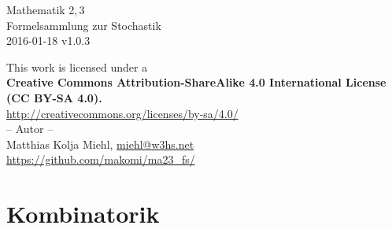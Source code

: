\documentclass[a4paper,10pt,titlepage]{scrartcl}
\makeatletter
\newcommand{\projectURL}{https://github.com/makomi/ma23\_fs/}
\newcommand{\thisdocDATE}{2016-01-18 v1.0.3}
\newcommand{\myNAME}{Matthias Kolja Miehl}
\newcommand{\myEMAIL}{miehl@w3hs.net}
\makeatother
\begin{document}

\begin{titlepage}
  \vspace*{\fill}
  \begin{center}
    \huge
    Mathematik 2,\,3\\
    Formelsammlung zur Stochastik\\
    \vspace{1.5cm}
    \large
    \thisdocDATE
  \end{center}
  \vspace*{\fill}
  \begin{center}{\fontsize{9pt}{11pt}\selectfont
    This work is licensed under a\\[1em]
    \textbf{Creative Commons Attribution-ShareAlike 4.0 International License (CC BY-SA 4.0).\\[1em]}
    \url{http://creativecommons.org/licenses/by-sa/4.0/}\\
  }
  \vspace*{\fill}
%
  -- Autor -- \medskip\\
  \myNAME, \href{mailto:\myEMAIL}{\myEMAIL}\smallskip\\
  \url{\projectURL}
  \vspace*{1.4cm}
  \end{center}
\end{titlepage}

\newpage

\setcounter{page}{1}


\section*{Kombinatorik}
\label{sec:kombinatorik}
\end{document}
